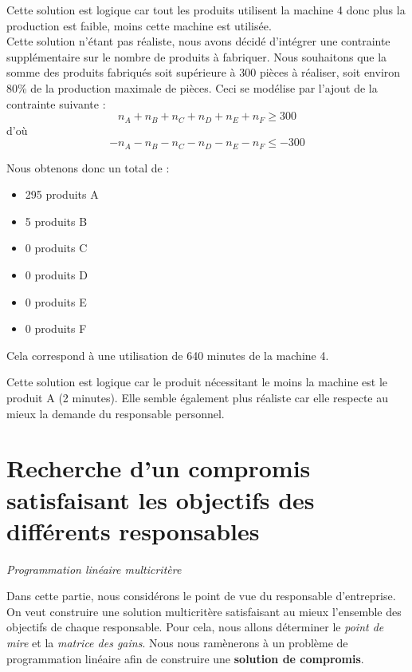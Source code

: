 \documentclass[a4paper,10pt]{article}
\begin{document}
Cette solution est logique car tout les produits utilisent la machine 4 donc plus la production est faible, moins cette machine est utilisée.\\

Cette solution n'étant pas réaliste, nous avons décidé d'intégrer une contrainte supplémentaire sur le nombre de produits à fabriquer. Nous souhaitons que la somme des produits fabriqués soit supérieure à 300 pièces à réaliser, soit environ 80\% de la production maximale de pièces.
Ceci se modélise par l'ajout de la contrainte suivante :\\

$$n_A + n_B + n_C + n_D + n_E + n_F \geq 300$$
d'où $$-n_A -n_B -n_C -n_D -n_E -n_F \leq -300$$

Nous obtenons donc un total de :\newline
\begin{itemize}
\item[\textbullet] 295 produits A
\item[\textbullet] 5 produits B
\item[\textbullet] 0 produits C
\item[\textbullet] 0 produits D
\item[\textbullet] 0 produits E
\item[\textbullet] 0 produits F\newline
\end{itemize}
Cela correspond à une utilisation de 640 minutes de la machine 4.\newline

Cette solution est logique car le produit nécessitant le moins la machine est le produit A (2 minutes). Elle semble également plus réaliste car elle respecte au mieux la demande du responsable personnel.



\newpage
\part{Recherche d'un compromis satisfaisant les objectifs des différents responsables}
\begin{large}
\emph{Programmation linéaire multicritère} \\
\end{large}

Dans cette partie, nous considérons le point de vue du responsable d'entreprise. On veut construire une solution multicritère satisfaisant au mieux l'ensemble des objectifs de chaque responsable. Pour cela, nous allons déterminer le \emph{point de mire} et la \emph{matrice des gains}. Nous nous ramènerons à un problème de programmation linéaire afin de construire une \textbf{solution de compromis}.
\end{document}
